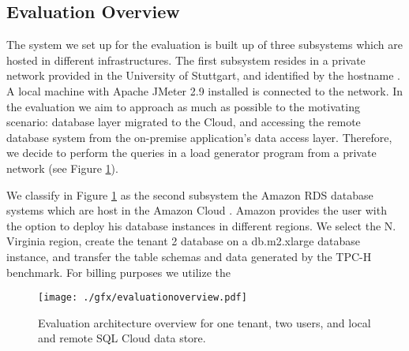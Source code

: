 \FloatBarrier

\subsection{Evaluation Overview}

The system we set up for the evaluation is built up of three subsystems which are hosted in different infrastructures. The first subsystem resides in a private network provided in the University of Stuttgart, and identified by the hostname . A local machine with Apache JMeter 2.9 installed is connected to the network. In the evaluation we aim to approach as much as possible to the motivating scenario: database layer migrated to the Cloud, and accessing the remote database system from the on-premise application's data access layer. Therefore, we decide to perform the queries in a load generator program from a private network (see Figure \ref{fig:evaluationoverview}). 

We classify in Figure \ref{fig:evaluationoverview} as the second subsystem the Amazon RDS database systems which are host in the Amazon Cloud \cite{amazonrds}. Amazon provides the user with the option to deploy his database instances in different regions. We select the N. Virginia region, create the tenant 2 database on a db.m2.xlarge database instance, and transfer the table schemas and data generated by the TPC-H benchmark. For billing purposes we utilize the  \cite{awseducational}  

\begin{figure}[htb]
	\centering
		\texttt{[image: ./gfx/evaluationoverview.pdf]}
	\caption[Evaluation Architecture Overview]{Evaluation architecture overview for one tenant, two users, and local and remote \ac{SQL} Cloud data store.}
	\label{fig:evaluationoverview}
\end{figure}


